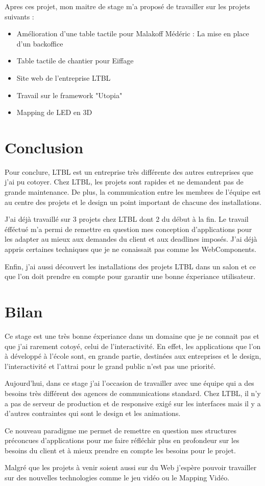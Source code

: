 \documentclass{article}
\begin{document}
Apres ces projet, mon maitre de stage m'a proposé de travailler sur les projets suivants :

\begin{itemize}
    \item Amélioration d'une table tactile pour Malakoff Médéric : La mise en place d'un backoffice
    \item Table tactile de chantier pour Eiffage
    \item Site web de l'entreprise LTBL
    \item Travail sur le framework "Utopia"
    \item Mapping de LED en 3D
\end{itemize}

\section{Conclusion}

Pour conclure, LTBL est un entreprise très différente des autres entreprises que j'ai pu cotoyer.
Chez LTBL, les projets sont rapides et ne demandent pas de grande maintenance.
De plus, la communication entre les membres de l'équipe est au centre des projets et le design un point important de chacune des installations.

J'ai déjà travaillé sur 3 projets chez LTBL dont 2 du début à la fin.
Le travail éfféctué m'a permi de remettre en question mes conception d'applications pour les adapter au mieux aux demandes du client et aux deadlines imposés.
J'ai déjà appris certaines techniques que je ne conaissait pas comme les WebComponents.

Enfin, j'ai aussi découvert les installations des projets LTBL dans un salon et ce que l'on doit prendre en compte pour garantir une bonne éxperiance utilisateur.

\section{Bilan}

Ce stage est une très bonne éxperiance dans un domaine que je ne connait pas et que j'ai rarement cotoyé, celui de l'interactivité.
En effet, les applications que l'on à développé à l'école sont, en grande partie, destinées aux entreprises et le design, l'interactivité et l'attrai pour le grand public n'est pas une priorité.

Aujourd'hui, dans ce stage j'ai l'occasion de travailler avec une équipe qui a des besoins très différent des agences de communications standard.
Chez LTBL, il n'y a pas de serveur de production et de responsive exigé sur les interfaces mais il y a d'autres contraintes qui sont le design et les animations.

Ce nouveau paradigme me permet de remettre en question mes structures préconcues d'applications pour me faire réfléchir plus en profondeur sur les besoins du client et à mieux prendre en compte les besoins pour le projet.

Malgré que les projets à venir soient aussi sur du Web j'espère pouvoir travailler sur des nouvelles technologies comme le jeu vidéo ou le Mapping Vidéo.
\end{document}
